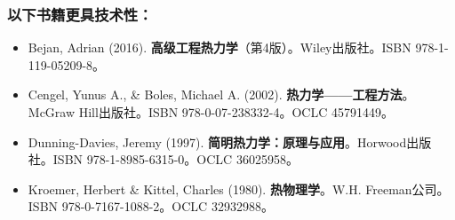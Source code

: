 \subsubsection{以下书籍更具技术性：}
\begin{itemize}
\item Bejan, Adrian (2016). \textbf{高级工程热力学}（第4版）。Wiley出版社。ISBN 978-1-119-05209-8。
\item Cengel, Yunus A., & Boles, Michael A. (2002). \textbf{热力学——工程方法}。McGraw Hill出版社。ISBN 978-0-07-238332-4。OCLC 45791449。
\item Dunning-Davies, Jeremy (1997). \textbf{简明热力学：原理与应用}。Horwood出版社。ISBN 978-1-8985-6315-0。OCLC 36025958。
\item Kroemer, Herbert & Kittel, Charles (1980). \textbf{热物理学}。W.H. Freeman公司。ISBN 978-0-7167-1088-2。OCLC 32932988。
\end{itemize}